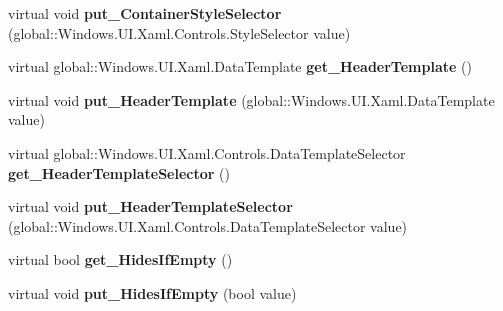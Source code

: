 \begin{DoxyCompactItemize}
\mbox{\label{class_windows_1_1_u_i_1_1_xaml_1_1_controls_1_1_group_style_a87a315fbb444d0a30f115de2f3729cc7}} 
virtual void {\bfseries put\+\_\+\+Container\+Style\+Selector} (global\+::\+Windows.\+U\+I.\+Xaml.\+Controls.\+Style\+Selector value)
\item 
\mbox{\label{class_windows_1_1_u_i_1_1_xaml_1_1_controls_1_1_group_style_af2b42ad3678973b6c5ffc2da772855d9}} 
virtual global\+::\+Windows.\+U\+I.\+Xaml.\+Data\+Template {\bfseries get\+\_\+\+Header\+Template} ()
\item 
\mbox{\label{class_windows_1_1_u_i_1_1_xaml_1_1_controls_1_1_group_style_abe3e5ea2a3be2465b15f097703102cd2}} 
virtual void {\bfseries put\+\_\+\+Header\+Template} (global\+::\+Windows.\+U\+I.\+Xaml.\+Data\+Template value)
\item 
\mbox{\label{class_windows_1_1_u_i_1_1_xaml_1_1_controls_1_1_group_style_a146db53a3fc94e4e3c9433f3c199f1ff}} 
virtual global\+::\+Windows.\+U\+I.\+Xaml.\+Controls.\+Data\+Template\+Selector {\bfseries get\+\_\+\+Header\+Template\+Selector} ()
\item 
\mbox{\label{class_windows_1_1_u_i_1_1_xaml_1_1_controls_1_1_group_style_a3b0221f01ff571dde0bf2c5bd0eeca2d}} 
virtual void {\bfseries put\+\_\+\+Header\+Template\+Selector} (global\+::\+Windows.\+U\+I.\+Xaml.\+Controls.\+Data\+Template\+Selector value)
\item 
\mbox{\label{class_windows_1_1_u_i_1_1_xaml_1_1_controls_1_1_group_style_a3b73f89d90026b986f6e55bc0566aedf}} 
virtual bool {\bfseries get\+\_\+\+Hides\+If\+Empty} ()
\item 
\mbox{\label{class_windows_1_1_u_i_1_1_xaml_1_1_controls_1_1_group_style_aa40a04f641abe85a825e92cf3eb7b442}} 
virtual void {\bfseries put\+\_\+\+Hides\+If\+Empty} (bool value)
\item 
\mbox{\label{class_windows_1_1_u_i_1_1_xaml_1_1_controls_1_1_group_style_a3c12aa3cefaa3b60dc882ca5393ec88f}} 

\end{DoxyCompactItemize}
